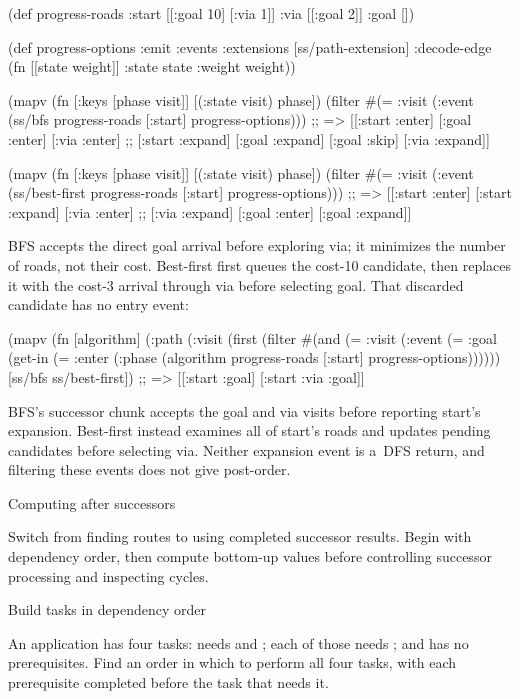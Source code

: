 {{{\begtt {}
(def progress-roads
  {:start [[:goal 10] [:via 1]]
   :via [[:goal 2]]
   :goal []})

(def progress-options
  {:emit :events
   :extensions [ss/path-extension]
   :decode-edge (fn [[state weight]] {:state state :weight weight})})

(mapv (fn [{:keys [phase visit]}] [(:state visit) phase])
      (filter #(= :visit (:event %
      (ss/bfs progress-roads [:start] progress-options)))
;; => [[:start :enter] [:goal :enter] [:via :enter]
;;     [:start :expand] [:goal :expand] [:goal :skip] [:via :expand]]

(mapv (fn [{:keys [phase visit]}] [(:state visit) phase])
      (filter #(= :visit (:event %
      (ss/best-first progress-roads [:start] progress-options)))
;; => [[:start :enter] [:start :expand] [:via :enter]
;;     [:via :expand] [:goal :enter] [:goal :expand]]
\endtt

BFS accepts the direct goal arrival before exploring via; it minimizes the
number of roads, not their cost. Best-first first queues the cost-10
candidate, then replaces it with the cost-3 arrival through via before
selecting goal. That discarded candidate has no entry event:

\begtt {}
(mapv (fn [algorithm]
        (:path (:visit (first (filter #(and (= :visit (:event %
                                            (= :goal (get-in %
                                            (= :enter (:phase %
                                      (algorithm progress-roads [:start]
                                                 progress-options))))))
      [ss/bfs ss/best-first])
;; => [[:start :goal] [:start :via :goal]]
\endtt

BFS's successor chunk accepts the goal and via visits before reporting
start's expansion. Best-first instead examines all of start's roads and updates pending
candidates before selecting via. Neither expansion event is a~DFS return, and
filtering these events does not give post-order.

\sec Computing after successors

Switch from finding routes to using completed successor results. Begin
with dependency order, then compute bottom-up values before controlling
successor processing and inspecting cycles.

\secc Build tasks in dependency order

 An application has four tasks:  needs
 and ; each of those needs ; and
 has no prerequisites. Find an order in which to perform all
four tasks, with each prerequisite completed before the task that needs it.

}}}
